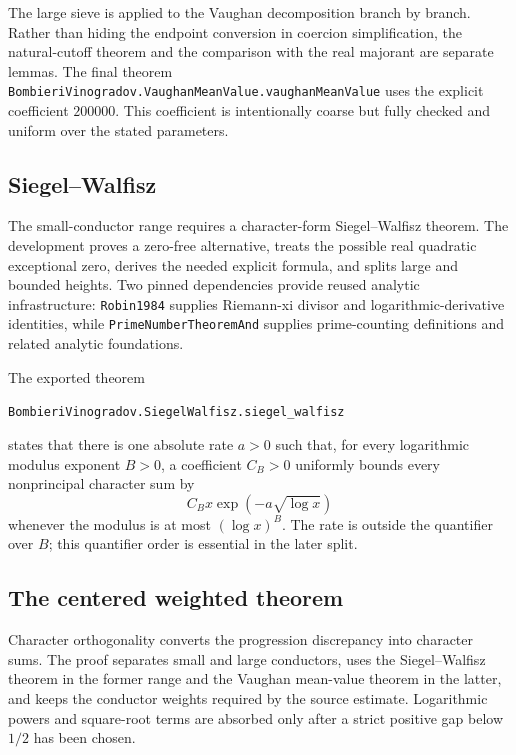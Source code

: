 \documentclass[11pt]{amsart}
\newcommand{\leanname}[1]{\nolinkurl{#1}}
\theoremstyle{definition}
\theoremstyle{remark}
\begin{document}
The large sieve is applied to the Vaughan decomposition branch by branch.
Rather than hiding the endpoint conversion in coercion simplification, the
natural-cutoff theorem and the comparison with the real majorant are separate
lemmas. The final theorem
\leanname{BombieriVinogradov.VaughanMeanValue.vaughanMeanValue} uses the
explicit coefficient $200000$. This coefficient is intentionally coarse but
fully checked and uniform over the stated parameters.

\subsection{Siegel--Walfisz}

The small-conductor range requires a character-form Siegel--Walfisz theorem.
The development proves a zero-free alternative, treats the possible real
quadratic exceptional zero, derives the needed explicit formula, and splits
large and bounded heights. Two pinned dependencies provide reused analytic
infrastructure: \texttt{Robin1984} supplies Riemann-xi divisor and
logarithmic-derivative identities, while \texttt{PrimeNumberTheoremAnd}
supplies prime-counting definitions and related analytic foundations.

\begin{samepage}
The exported theorem
\begin{center}
\leanname{BombieriVinogradov.SiegelWalfisz.siegel_walfisz}
\end{center}
states that there is one absolute rate $a>0$ such that, for every logarithmic
modulus exponent
$B>0$, a coefficient $C_B>0$ uniformly bounds every nonprincipal character
sum by
\[
  C_B x\exp\!\left(-a\sqrt{\log x}\right)
\]
whenever the modulus is at most $(\log x)^B$. The rate is outside the
quantifier over $B$; this quantifier order is essential in the later split.
\end{samepage}

\subsection{The centered weighted theorem}

Character orthogonality converts the progression discrepancy into character
sums. The proof separates small and large conductors, uses the
Siegel--Walfisz theorem in the former range and the Vaughan mean-value theorem
in the latter, and keeps the conductor weights required by the source
estimate. Logarithmic powers and square-root terms are absorbed only after a
strict positive gap below $1/2$ has been chosen.
\end{document}

